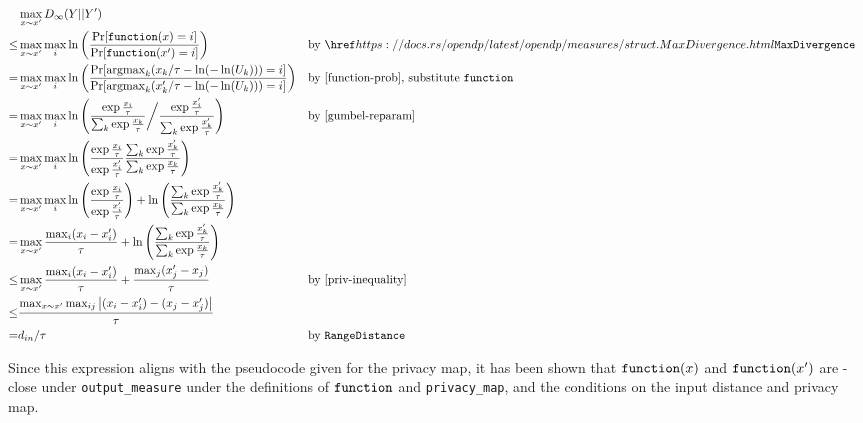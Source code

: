 \documentclass{article}
\begin{document}
\begin{align*}
    &\max_{x \sim x'} D_\infty(Y || Y') \\
    \leq& \max_{x \sim x'} \max_i \ln\left(\frac{\Pr[\function(x) = i]}{\Pr[\function(x') = i]}\right)
    &&\text{by } \rustdoc{measures/struct}{MaxDivergence}\\
    =& \max_{x \sim x'} \max_i \ln\left(\frac
            {\Pr[\mathrm{argmax}_k (x_k / \tau - \ln(-\ln(U_k))) = i]}
            {\Pr[\mathrm{argmax}_k (x'_k / \tau - \ln(-\ln(U_k))) = i]}
        \right) &&\text{by \ref{function-prob}, substitute \function}\\
    =& \max_{x \sim x'} \max_i \ln \left(
        \frac
            {\exp \frac{x_i}{\tau}}
            {\sum_{k} \exp\frac{x_k}{\tau}
        }
        \bigg/ \frac
            {\exp\frac{x'_i}{\tau}}
            {\sum_{k} \exp\frac{x'_k}{\tau}} \right)
        &&\text{by \ref{gumbel-reparam}} \\
    =& \max_{x \sim x'} \max_i \ln \left(\frac
        {\exp\frac{x_i}{\tau}}{\exp\frac{x'_i}{\tau}}
        \frac{\sum_{k} \exp\frac{x'_k}{\tau}}{\sum_{k} \exp\frac{x_k}{\tau}}\right) \\
    =& \max_{x \sim x'} \max_i \ln \left(\frac
        {\exp\frac{x_i}{\tau}}{\exp\frac{x'_i}{\tau}}\right) + \ln \left(
        \frac{\sum_{k} \exp\frac{x'_k}{\tau}}{\sum_{k} \exp\frac{x_k}{\tau}}\right) \\
    =& \max_{x \sim x'} \frac{\max_i (x_i - x'_i)}{\tau}
        + \ln\left(\frac{\sum_{k} \exp\frac{x'_k}{\tau}}{\sum_{k} \exp\frac{x_k}{\tau}}\right) \\
    \leq& \max_{x \sim x'} \frac{\max_i (x_i - x'_i)}{\tau} + \frac{\max_j (x'_j - x_j)}{\tau} &&\text{by \ref{priv-inequality}} \\
    \leq& \frac{\max_{x \sim x'} \max_{ij} \abs{(x_i - x'_i) - (x_j - x'_j)}}{\tau} \\
    =& d_{in} / \tau &&\text{by }\texttt{RangeDistance}\\
\end{align*}

Since this expression aligns with the pseudocode given for the privacy map,
it has been shown that $\texttt{function}(x)$ and $\texttt{function}(x')$ are \dout-close under \texttt{output\_measure}
under the definitions of $\texttt{function}$ and \texttt{privacy\_map},
and the conditions on the input distance and privacy map.





\end{document}

